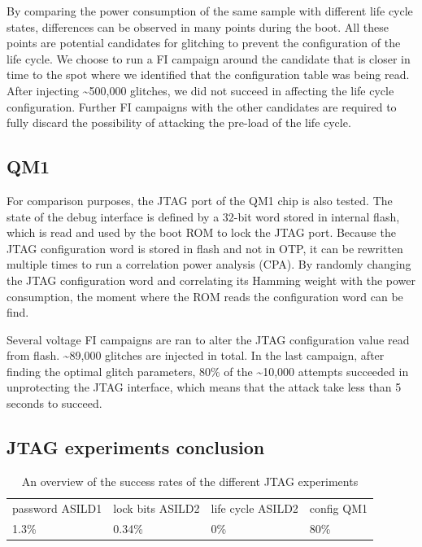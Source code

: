 \documentclass[a4paper, 10pt]{IEEEtran}
\newcommand{\TI}{ASILD1\xspace}
\newcommand{\ST}{ASILD2\xspace}
\newcommand{\NXP}{QM1\xspace}
\begin{document}
By comparing the power consumption of the same sample with different life cycle states, differences can be observed in many points during the boot. All these points are potential candidates for glitching to prevent the configuration of the life cycle. We choose to run a FI campaign around the candidate that is closer in time to the spot where we identified that the configuration table was being read. After injecting \textasciitilde500,000 glitches, we did not succeed in affecting the life cycle configuration. Further FI campaigns with the other candidates are required to fully discard the possibility of attacking the pre-load of the life cycle.

\subsection{\NXP}

For comparison purposes, the JTAG port of the \NXP chip is also tested. The state of the debug interface is defined by a 32-bit word stored in internal flash, which is read and used by the boot ROM to lock the JTAG port. Because the JTAG configuration word is stored in flash and not in OTP, it can be rewritten multiple times to run a correlation power analysis (CPA). By randomly changing the JTAG configuration word and correlating its Hamming weight with the power consumption, the moment where the ROM reads the configuration word can be find. 

Several voltage FI campaigns are ran to alter the JTAG configuration value read from flash. \textasciitilde89,000 glitches are injected in total. In the last campaign, after finding the optimal glitch parameters, 80\% of the \textasciitilde10,000 attempts succeeded in unprotecting the JTAG interface, which means that the attack take less than 5 seconds to succeed.


\subsection{JTAG experiments conclusion}
\begin{table}[htb]
\caption{An overview of the success rates of the different JTAG experiments} 
\label{tab:jtag-experiments}
\centering
\begin{tabular}{p{} p{} p{} p{}}
\toprule
          
        password \TI
        & lock bits \ST
        & life cycle \ST
        & config \NXP
        \\
    \cmidrule(lr){1-4}          
        1.3\%
        & 0.34\%
        & 0\%
        & 80\%
        \\
\bottomrule
\end{tabular}
\end{table}
\end{document}
